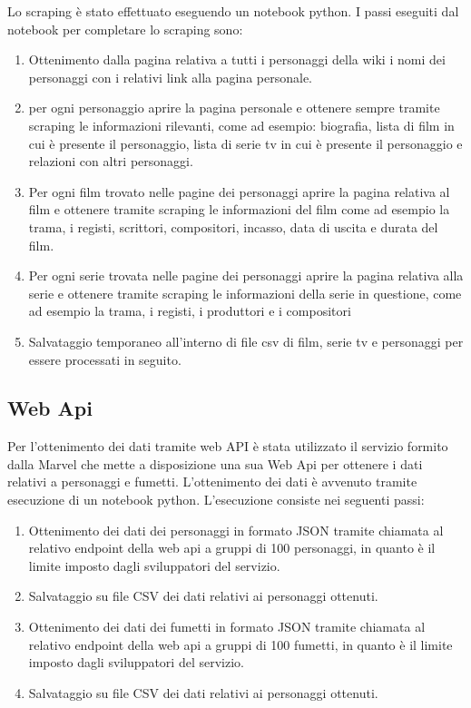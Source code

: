 \documentclass[
10pt, %
a4paper, %
oneside, %
headinclude,footinclude, %
BCOR5mm, %
]{scrartcl}
\begin{document}
Lo scraping è stato effettuato eseguendo un notebook python.
I passi eseguiti dal notebook per completare lo scraping sono:
\begin{enumerate}
\item Ottenimento dalla pagina relativa a tutti i personaggi della wiki i nomi dei personaggi con i relativi link alla pagina personale.
\item per ogni personaggio aprire la pagina personale e ottenere sempre tramite scraping le informazioni rilevanti, come ad esempio: biografia, lista di film in cui è presente il personaggio, lista di serie tv in cui è presente il personaggio e relazioni con altri personaggi.
\item Per ogni film trovato nelle pagine dei personaggi aprire la pagina relativa al film e ottenere tramite scraping le informazioni del film come ad esempio la trama, i registi, scrittori, compositori, incasso, data di uscita e durata del film.
\item Per ogni serie trovata nelle pagine dei personaggi aprire la pagina relativa alla serie e ottenere tramite scraping le informazioni della serie in questione, come ad esempio la trama, i registi, i produttori e i compositori
\item Salvataggio temporaneo all'interno di file csv di film, serie tv e personaggi per essere processati in seguito.
\end{enumerate}

\subsection{Web Api}
Per l'ottenimento dei dati tramite web API è stata utilizzato il servizio formito dalla Marvel che mette a disposizione una sua Web Api per ottenere i dati relativi a personaggi e fumetti.
L'ottenimento dei dati è avvenuto tramite esecuzione di un notebook python.
L'esecuzione consiste nei seguenti passi:
\begin{enumerate}
\item Ottenimento dei dati dei personaggi in formato JSON tramite chiamata al relativo endpoint della web api a gruppi di 100 personaggi, in quanto è il limite imposto dagli sviluppatori del servizio.
\item Salvataggio su file CSV dei dati relativi ai personaggi ottenuti.
\item Ottenimento dei dati dei fumetti in formato JSON tramite chiamata al relativo endpoint della web api a gruppi di 100 fumetti, in quanto è il limite imposto dagli sviluppatori del servizio.
\item Salvataggio su file CSV dei dati relativi ai personaggi ottenuti.
\end{enumerate}
\end{document}
